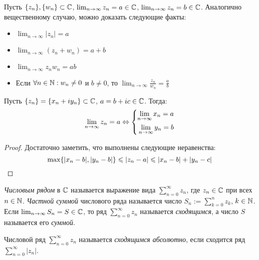 \begin{note}
	Пусть $\{z_n\}, \{w_n\} \subset \Cm$, $\lim_{n \to \infty}z_n = a \in \Cm$, $\lim_{n \to \infty}z_n = b \in \Cm$. Аналогично вещественному случаю, можно доказать следующие факты:
	\begin{itemize}
		\item $\lim_{n \to \infty}|z_n| = a$
		\item $\lim_{n \to \infty}(z_n+w_n) = a+b$
		\item $\lim_{n \to \infty}z_nw_n = ab$
		\item Если $\forall n \in \N: w_n \ne 0$ и $b \ne 0$, то $\lim_{n \to \infty}\frac{z_n}{w_n} = \frac ab$
	\end{itemize}
\end{note}

\begin{proposition}
	Пусть $\{z_n\} = \{x_n + iy_n\} \subset \Cm$, $a = b+ic \in \Cm$. Тогда:
	\[\lim_{n \to \infty}z_n = a \lra \System{
		\lim_{n \to \infty}x_n = a\\
		\lim_{n \to \infty}y_n = b
	}\]
\end{proposition}

\begin{proof}
	Достаточно заметить, что выполнены следующие неравенства:
	\[\max\{|x_n - b|, |y_n - b|\} \le |z_n - a| \le |x_n - b| + |y_n - c|\qedhere\]
\end{proof}

\begin{definition}
	\textit{Числовым рядом} в $\Cm$ называется выражение вида $\sum_{n = 0}^\infty z_n$, где $z_n \in \Cm$ при всех $n \in \N$. \textit{Частной суммой} числового ряда называется число $S_n := \sum_{k = 0}^nz_k$, $k \in \N$. Если $\lim_{n \to \infty}S_n = S \in \Cm$, то ряд $\sum_{n = 0}^\infty z_n$ называется \textit{сходящимся}, а число $S$ называется его \textit{суммой}.
\end{definition}

\begin{definition}
	Числовой ряд $\sum_{n = 0}^\infty z_n$ называется \textit{сходящимся абсолютно}, если сходится ряд $\sum_{n = 0}^\infty|z_n|$.
\end{definition}